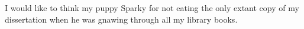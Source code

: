 \chapter*{\AckChap}

I would like to think my puppy Sparky for not eating the only extant copy of my
dissertation when he was gnawing through all my library books.